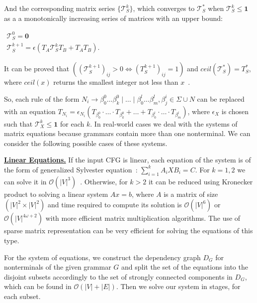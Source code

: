 \documentclass[sigconf]{acmart}
\begin{document}
And the corresponding matrix series $\{ \mathcal{T}_S^{k}\}$, which converges to $\mathcal{T}_S^*$ when $\mathcal{T}_S^{k} \leq \textbf{1}$ as a a monotonically increasing series of matrices with an upper bound:

\begin{center}
\(
\left.
\begin{array}{c}
\mathcal{T}_S^0 = \mathbf{0} \\
\mathcal{T}_S^{k+1} = \epsilon(T_A \mathcal{T}_S^k T_B + T_A T_B).
\end{array} 
\right.
\)
\end{center}

It can be proved that $((\mathcal{T}_S^{k+1})_{ij} > 0 \iff (T_S^{k+1})_{ij} = 1)$ and $ceil(\mathcal{T}_S^*) = T_S^*$, where $ceil(x)$ returns the smallest integer not less than $x$~\cite{sato2017linear}.

So, each rule of the form $N_i \to \beta^0_0 \dots \beta^0_k \mid \ldots \mid \beta^l_0 \dots \beta^l_m, \beta^i_j \in \Sigma \cup N$ can be replaced with an equation 
$T_{N_i} = \epsilon_{N_i}(T_{\beta^0_0}\cdot \ldots \cdot T_{\beta^0_k} + \ldots + T_{\beta^l_0}\cdot \ldots \cdot T_{\beta^l_m}) $, where $\epsilon_X$ is chosen such that $\mathcal{T}_X^{k} \leq \textbf{1}$ for each $k$.
In real-world cases we deal with the systems of matrix equations because grammars contain more than one nonterminal. 
We can consider the following possible cases of these systems.

\underline{\textbf{Linear Equations.}}
If the input CFG is linear, each equation of the system is of the form of generalized Sylvester equation~\cite{!!!}: $\sum_{i = 1}^{k} A_iXB_i = C$.
For $k = 1, 2$ we can solve it in $\mathcal{O}(|V|^3)$~\cite{!!!}.
Otherwise, for $k > 2$ it can be reduced using Kronecker product to solving a linear system $Ax = b$, where $A$ is a matrix of size $(|V|^2 \times |V|^2)$ and time required to compute its solution is $\mathcal{O}(|V|^6)$ or $\mathcal{O}(|V|^{4\omega + 2})$ with more efficient matrix multiplication algorithms. 
The use of sparse matrix representation can be very efficient for solving the equations of this type.

For the system of equations, we construct the dependency graph $D_G$ for nonterminals of the given grammar $G$ and split the set of the equations into the disjoint subsets accordingly to the set of strongly connected components in $D_G$, which can be found in $\mathcal{O}(|V| + |E|)$.
Then we solve our system in stages, for each subset.
\end{document}
